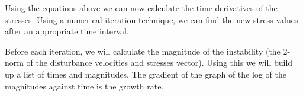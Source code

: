 \documentclass[12pt,a4paper]{article}
\begin{document}
Using the equations above we can now calculate the time derivatives of the stresses. Using a numerical iteration technique, we can find the new stress values after an appropriate time interval. 

Before each iteration, we will calculate the magnitude of the instability (the 2-norm of the disturbance velocities and stresses vector). Using this we will build up a list of times and magnitudes. The gradient of the graph of the log of the magnitudes against time is the growth rate. 

\end{document}

